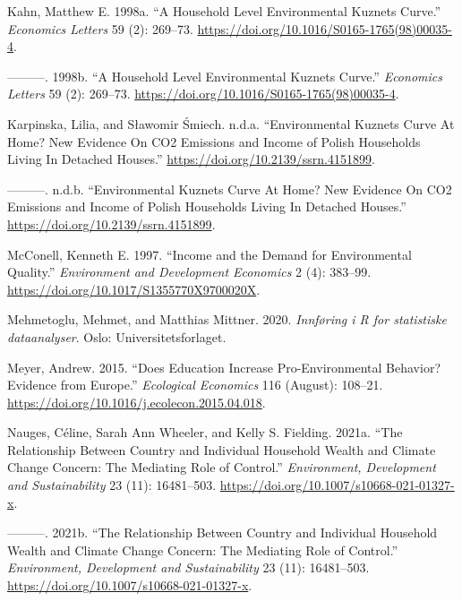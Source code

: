 \documentclass[
  12pt,
  letterpaper,
  DIV=11,
  numbers=noendperiod]{scrartcl}
\newlength{\cslhangindent}
\newlength{\cslentryspacingunit} %
\newenvironment{CSLReferences}[2] %
 {%
  \setlength{\parindent}{0pt}
  \ifodd #1
  \let\oldpar\par
  \def\par{\hangindent=\cslhangindent\oldpar}
  \fi
  \setlength{\parskip}{#2\cslentryspacingunit}
 }%
 {}
\begin{document}
\begin{CSLReferences}{1}{0}
\leavevmode{}%
Kahn, Matthew E. 1998a. {``A Household Level Environmental Kuznets
Curve.''} \emph{Economics Letters} 59 (2): 269--73.
\url{https://doi.org/10.1016/S0165-1765(98)00035-4}.

\leavevmode{}%
---------. 1998b. {``A Household Level Environmental Kuznets Curve.''}
\emph{Economics Letters} 59 (2): 269--73.
\url{https://doi.org/10.1016/S0165-1765(98)00035-4}.

\leavevmode{}%
Karpinska, Lilia, and Sławomir Śmiech. n.d.a. {``Environmental Kuznets
Curve At Home? New Evidence On CO2 Emissions and Income of Polish
Households Living In Detached Houses.''}
\url{https://doi.org/10.2139/ssrn.4151899}.

\leavevmode{}%
---------. n.d.b. {``Environmental Kuznets Curve At Home? New Evidence
On CO2 Emissions and Income of Polish Households Living In Detached
Houses.''} \url{https://doi.org/10.2139/ssrn.4151899}.

\leavevmode{}%
McConell, Kenneth E. 1997. {``Income and the Demand for Environmental
Quality.''} \emph{Environment and Development Economics} 2 (4): 383--99.
\url{https://doi.org/10.1017/S1355770X9700020X}.

\leavevmode{}%
Mehmetoglu, Mehmet, and Matthias Mittner. 2020. \emph{Innføring i R for
statistiske dataanalyser}. Oslo: Universitetsforlaget.

\leavevmode{}%
Meyer, Andrew. 2015. {``Does Education Increase Pro-Environmental
Behavior? Evidence from Europe.''} \emph{Ecological Economics} 116
(August): 108--21. \url{https://doi.org/10.1016/j.ecolecon.2015.04.018}.

\leavevmode{}%
Nauges, Céline, Sarah Ann Wheeler, and Kelly S. Fielding. 2021a. {``The
Relationship Between Country and Individual Household Wealth and Climate
Change Concern: The Mediating Role of Control.''} \emph{Environment,
Development and Sustainability} 23 (11): 16481--503.
\url{https://doi.org/10.1007/s10668-021-01327-x}.

\leavevmode{}%
---------. 2021b. {``The Relationship Between Country and Individual
Household Wealth and Climate Change Concern: The Mediating Role of
Control.''} \emph{Environment, Development and Sustainability} 23 (11):
16481--503. \url{https://doi.org/10.1007/s10668-021-01327-x}.


\end{CSLReferences}
\end{document}
